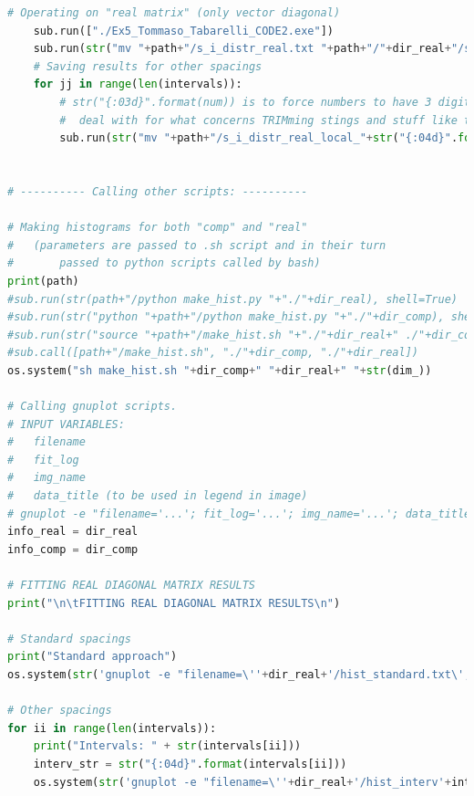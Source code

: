 \documentclass[12pt, a4paper, notitlepage]{report}
\begin{document}
\begin{lstlisting}[language=Python]
	# Operating on "real matrix" (only vector diagonal)
	sub.run(["./Ex5_Tommaso_Tabarelli_CODE2.exe"])
	sub.run(str("mv "+path+"/s_i_distr_real.txt "+path+"/"+dir_real+"/s_i_distr"+str(ii)+".txt"), shell=True)
	# Saving results for other spacings
	for jj in range(len(intervals)):
		# str("{:03d}".format(num)) is to force numbers to have 3 digits (Fortran is hard to
		#  deal with for what concerns TRIMming stings and stuff like that...
		sub.run(str("mv "+path+"/s_i_distr_real_local_"+str("{:04d}".format(intervals[jj]))+".txt "+path+"/"+dir_real+"/s_i_distr_interv"+str("{:04d}".format(intervals[jj]))+"_"+str(ii)+".txt"), shell=True)


# ---------- Calling other scripts: ----------

# Making histograms for both "comp" and "real"
#	(parameters are passed to .sh script and in their turn
#		passed to python scripts called by bash)
print(path)
#sub.run(str(path+"/python make_hist.py "+"./"+dir_real), shell=True)
#sub.run(str("python "+path+"/python make_hist.py "+"./"+dir_comp), shell=True)
#sub.run(str("source "+path+"/make_hist.sh "+"./"+dir_real+" ./"+dir_comp), shell=True)
#sub.call([path+"/make_hist.sh", "./"+dir_comp, "./"+dir_real])
os.system("sh make_hist.sh "+dir_comp+" "+dir_real+" "+str(dim_))

# Calling gnuplot scripts.
# INPUT VARIABLES:
#	filename
#	fit_log
#	img_name
#	data_title (to be used in legend in image)
# gnuplot -e "filename='...'; fit_log='...'; img_name='...'; data_title='...'" fit_hist.gnu
info_real = dir_real
info_comp = dir_comp

# FITTING REAL DIAGONAL MATRIX RESULTS
print("\n\tFITTING REAL DIAGONAL MATRIX RESULTS\n")

# Standard spacings
print("Standard approach")
os.system(str('gnuplot -e "filename=\''+dir_real+'/hist_standard.txt\'; fit_log=\''+dir_real+'/fit_real_standard.log\'; img_name=\''+dir_real+'/hist_standard_fit\'; fit_save=\''+dir_real+'/fit_real_standard_res.txt\'; data_title=\'real'+str(dim_)+' standard\'" "gnu_fit.gnu"'))

# Other spacings
for ii in range(len(intervals)):
	print("Intervals: " + str(intervals[ii]))
	interv_str = str("{:04d}".format(intervals[ii]))
	os.system(str('gnuplot -e "filename=\''+dir_real+'/hist_interv'+interv_str+'.txt\'; fit_log=\''+dir_real+'/fit_real_interv'+interv_str+'.log\'; img_name=\''+dir_real+'/hist_interval_'+interv_str+'_fit\'; fit_save=\''+dir_real+'/fit_real_interv'+interv_str+'_res.txt\'; data_title=\'real'+str(dim_)+' interval'+interv_str+'\'" "gnu_fit.gnu"'))



\end{lstlisting}
\end{document}
